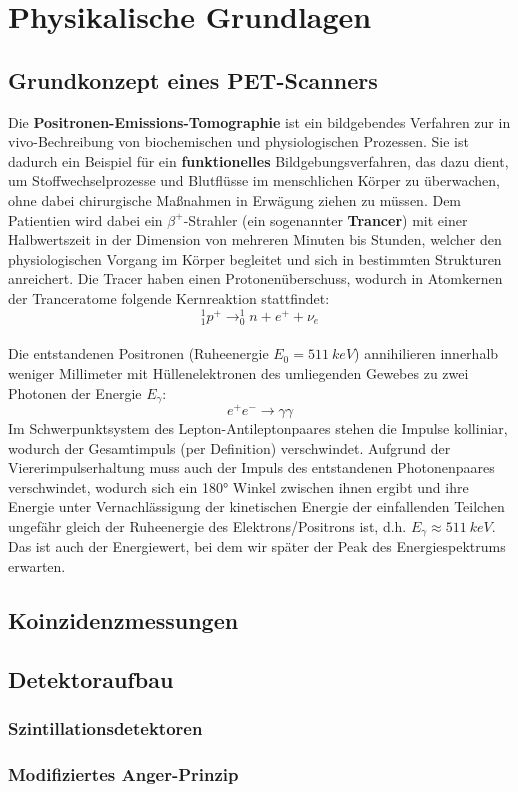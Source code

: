 \section{Physikalische Grundlagen}
\subsection{Grundkonzept eines PET-Scanners}
	Die \textbf{Positronen-Emissions-Tomographie} ist ein bildgebendes Verfahren zur in vivo-Bechreibung von biochemischen und physiologischen Prozessen. Sie ist dadurch ein Beispiel für ein \textbf{funktionelles} Bildgebungsverfahren, das dazu dient, um Stoffwechselprozesse und Blutflüsse im menschlichen Körper zu überwachen, ohne dabei chirurgische Maßnahmen in Erwägung ziehen zu müssen. Dem Patientien wird dabei ein $\beta^+$-Strahler (ein sogenannter \textbf{Trancer}) mit einer Halbwertszeit in der Dimension von mehreren Minuten bis Stunden, welcher den physiologischen Vorgang im Körper begleitet und sich in bestimmten Strukturen anreichert. Die Tracer haben einen Protonenüberschuss, wodurch in Atomkernen der Tranceratome folgende Kernreaktion stattfindet: 
	\begin{equation*}
	^1_1p^+ \longrightarrow ^1_0n + e^+ + \nu_e
	\end{equation*}\\
	Die entstandenen Positronen (Ruheenergie $E_0 = 511\ \unit{keV}$) annihilieren innerhalb weniger Millimeter mit Hüllenelektronen des umliegenden Gewebes zu zwei Photonen der Energie $E_\gamma$:\\
	\begin{equation*}
		e^+ e^- \longrightarrow \gamma \gamma
	\end{equation*}
	Im Schwerpunktsystem des Lepton-Antileptonpaares stehen die Impulse kolliniar, wodurch der Gesamtimpuls (per Definition) verschwindet. Aufgrund der Viererimpulserhaltung muss auch der Impuls des entstandenen Photonenpaares verschwindet, wodurch sich ein 180° Winkel zwischen ihnen ergibt und ihre Energie unter Vernachlässigung der kinetischen Energie der einfallenden Teilchen ungefähr gleich der Ruheenergie des Elektrons/Positrons ist, d.h. $E_\gamma \approx 511\ \unit{keV}$. Das ist auch der Energiewert, bei dem wir später der Peak des Energiespektrums erwarten.
\subsection{Koinzidenzmessungen}

\subsection{Detektoraufbau}
\subsubsection{Szintillationsdetektoren}

\subsubsection{Modifiziertes Anger-Prinzip}